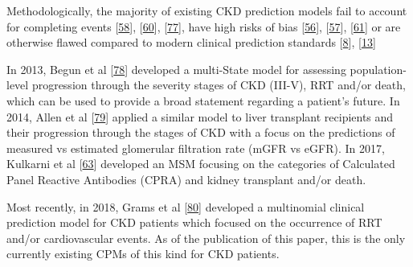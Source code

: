 \documentclass[12pt,PhD,twoside,openright]{muthesis}
\begin{document}
Methodologically, the majority of existing CKD prediction models fail to account for completing events {[}\protect\hyperlink{ref-bansal_development_2015}{58}{]}, {[}\protect\hyperlink{ref-wick_clinical_2017}{60}{]}, {[}\protect\hyperlink{ref-perotte_risk_2015}{77}{]}, have high risks of bias {[}\protect\hyperlink{ref-johnson_predicting_2007}{56}{]}, {[}\protect\hyperlink{ref-landray_prediction_2010}{57}{]}, {[}\protect\hyperlink{ref-johnson_predicting_2008}{61}{]} or are otherwise flawed compared to modern clinical prediction standards {[}\protect\hyperlink{ref-steyerberg_prognosis_2013}{8}{]}, {[}\protect\hyperlink{ref-collins_transparent_2015}{13}{]}

In 2013, Begun et al {[}\protect\hyperlink{ref-begun_identification_2013}{78}{]} developed a multi-State model for assessing population-level progression through the severity stages of CKD (III-V), RRT and/or death, which can be used to provide a broad statement regarding a patient's future. In 2014, Allen et al {[}\protect\hyperlink{ref-allen_chronic_2014}{79}{]} applied a similar model to liver transplant recipients and their progression through the stages of CKD with a focus on the predictions of measured vs estimated glomerular filtration rate (mGFR vs eGFR). In 2017, Kulkarni et al {[}\protect\hyperlink{ref-kulkarni_transition_2017}{63}{]} developed an MSM focusing on the categories of Calculated Panel Reactive Antibodies (CPRA) and kidney transplant and/or death.

Most recently, in 2018, Grams et al {[}\protect\hyperlink{ref-grams_predicting_2018}{80}{]} developed a multinomial clinical prediction model for CKD patients which focused on the occurrence of RRT and/or cardiovascular events. As of the publication of this paper, this is the only currently existing CPMs of this kind for CKD patients.
\end{document}
